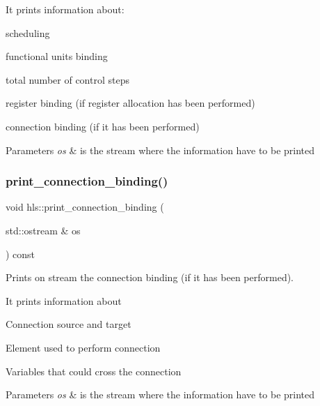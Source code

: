 It prints information about\+:
\begin{DoxyItemize}
\item scheduling
\item functional units binding
\item total number of control steps
\item register binding (if register allocation has been performed)
\item connection binding (if it has been performed) 
\begin{DoxyParams}{Parameters}
{\em os} & is the stream where the information have to be printed \\
\hline
\end{DoxyParams}

\end{DoxyItemize}\mbox{\label{classhls_aaafdd94ce75cb9c8cef85be61101b239}} 
\subsubsection{\texorpdfstring{print\+\_\+connection\+\_\+binding()}{print\_connection\_binding()}}
{\footnotesize\ttfamily void hls\+::print\+\_\+connection\+\_\+binding (\begin{DoxyParamCaption}\item[{std\+::ostream \&}]{os }\end{DoxyParamCaption}) const}



Prints on stream the connection binding (if it has been performed). 

It prints information about
\begin{DoxyItemize}
\item Connection source and target
\item Element used to perform connection
\item Variables that could cross the connection 
\begin{DoxyParams}{Parameters}
{\em os} & is the stream where the information have to be printed \\
\hline
\end{DoxyParams}

\end{DoxyItemize}\mbox{\label{classhls_af6e8c0fb3d03ffde89044c215a6afc8e}} 
